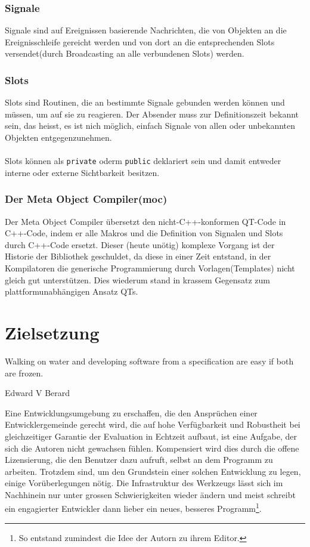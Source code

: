 \subsubsection{Signale}
	Signale sind auf Ereignissen basierende Nachrichten, die von Objekten an die Ereignisschleife gereicht werden und von dort an die entsprechenden Slots
	versendet(durch Broadcasting an alle verbundenen Slots) werden.
\subsubsection{Slots}
	Slots sind Routinen, die an bestimmte Signale gebunden werden können und müssen, um auf sie zu reagieren. Der Absender muss zur 
	Definitionszeit bekannt sein, das heisst, es ist nich möglich, einfach Signale von allen oder unbekannten Objekten entgegenzunehmen.
\paragraph{}
	Slots können als \texttt{private} oderm \texttt{public} deklariert sein und damit entweder interne oder externe Sichtbarkeit besitzen.
\subsubsection{Der Meta Object Compiler(moc)}
	Der Meta Object Compiler übersetzt den nicht-C++-konformen QT-Code in C++-Code, indem er alle Makros und die Definition von Signalen und Slots
	durch C++-Code ersetzt. Dieser (heute unötig) komplexe Vorgang ist der Historie der Bibliothek geschuldet, da diese in einer Zeit entstand, in der
	Kompilatoren die generische Programmierung durch Vorlagen(Templates) nicht gleich gut unterstützen. Dies wiederum stand in krassem Gegensatz
	zum plattformunabhängigen Ansatz QTs.
\newpage
\section{Zielsetzung} \label{sec:Ziel}
\epigraph{Walking on water and developing software from a specification are easy if both are frozen.}{Edward V Berard}
	Eine Entwicklungsumgebung zu erschaffen, die den Ansprüchen einer Entwicklergemeinde gerecht wird, die auf hohe Verfügbarkeit und Robustheit bei 
    gleichzeitiger Garantie der Evaluation in Echtzeit aufbaut, ist eine Aufgabe, der sich die Autoren nicht gewachsen fühlen. Kompensiert wird dies
    durch die offene Lizensierung, die den Benutzer dazu aufruft, selbst an dem Programm zu arbeiten. Trotzdem sind, um den Grundstein einer solchen
    Entwicklung zu legen, einige Vorüberlegungen nötig. Die Infrastruktur des Werkzeugs lässt sich im Nachhinein nur unter grossen Schwierigkeiten 
    wieder ändern und meist schreibt ein engagierter Entwickler dann lieber ein neues, besseres Programm\footnote{So entstand zumindest die Idee der
    Autorn zu ihrem Editor.}.
